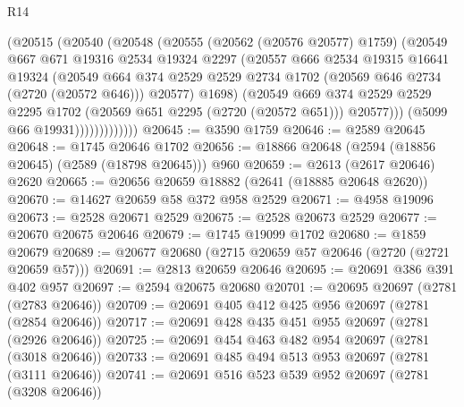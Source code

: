 \begin{lexlean}{R14}
\begin{coremodule}
                      (@20515
                        (@20540
                          (@20548
                            (@20555
                              (@20562 (@20576 @20577) @1759)
                              (@20549
                                @667
                                @671
                                @19316
                                @2534
                                @19324
                                @2297
                                (@20557
                                  @666
                                  @2534
                                  @19315
                                  @16641
                                  @19324
                                  (@20549
                                    @664
                                    @374
                                    @2529
                                    @2529
                                    @2734
                                    @1702
                                    (@20569 @646 @2734 (@2720 (@20572 @646)))
                                    @20577)
                                  @1698)
                                (@20549
                                  @669
                                  @374
                                  @2529
                                  @2529
                                  @2295
                                  @1702
                                  (@20569 @651 @2295 (@2720 (@20572 @651)))
                                  @20577)))
                            (@5099 @66 @19931)))))))))))))
@20645 := @3590 @1759
@20646 := @2589 @20645
@20648 := @1745 @20646 @1702
@20656 := @18866 @20648 (@2594 (@18856 @20645) (@2589 (@18798 @20645))) @960
@20659 := @2613 (@2617 @20646) @2620
@20665 := @20656 @20659 @18882 (@2641 (@18885 @20648 @2620))
@20670 := @14627 @20659 @58 @372 @958 @2529
@20671 := @4958 @19096
@20673 := @2528 @20671 @2529
@20675 := @2528 @20673 @2529
@20677 := @20670 @20675 @20646
@20679 := @1745 @19099 @1702
@20680 := @1859 @20679
@20689 := @20677 @20680 (@2715 @20659 @57 @20646 (@2720 (@2721 @20659 @57)))
@20691 := @2813 @20659 @20646
@20695 := @20691 @386 @391 @402 @957
@20697 := @2594 @20675 @20680
@20701 := @20695 @20697 (@2781 (@2783 @20646))
@20709 := @20691 @405 @412 @425 @956 @20697 (@2781 (@2854 @20646))
@20717 := @20691 @428 @435 @451 @955 @20697 (@2781 (@2926 @20646))
@20725 := @20691 @454 @463 @482 @954 @20697 (@2781 (@3018 @20646))
@20733 := @20691 @485 @494 @513 @953 @20697 (@2781 (@3111 @20646))
@20741 := @20691 @516 @523 @539 @952 @20697 (@2781 (@3208 @20646))

\end{coremodule}
\end{lexlean}
